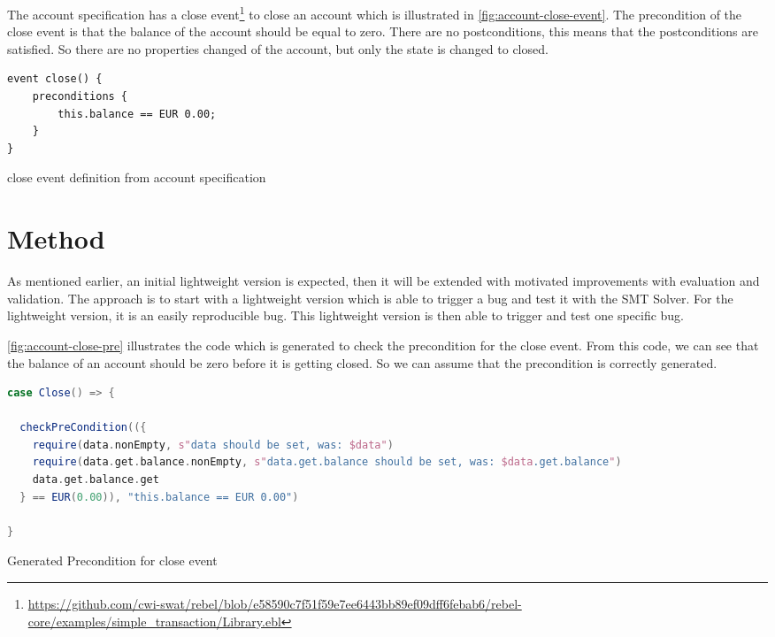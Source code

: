 The account specification has a close event\footnote{\url{https://github.com/cwi-swat/rebel/blob/e58590c7f51f59e7ee6443bb89ef09dff6febab6/rebel-core/examples/simple_transaction/Library.ebl}}
to close an account which is illustrated in \autoref{fig:account-close-event}.
The precondition of the close event is that the balance of the account should be
equal to zero. There are no postconditions, this means that the postconditions
are satisfied. So there are no properties changed of the account, but only the state
is changed to closed.

\begin{sourcecode}[h!]
\begin{lstlisting}[]
event close() {
	preconditions {
		this.balance == EUR 0.00;
	}
}
\end{lstlisting}
\caption{close event definition from account specification}\label{fig:account-close-event}
\end{sourcecode}
\FloatBarrier

\section{Method}

As mentioned earlier, an initial lightweight version is expected, then it will
be extended with motivated improvements with evaluation and validation. The
approach is to start with a lightweight version which is able to trigger a bug
and test it with the SMT Solver. For the lightweight version, it is an easily
reproducible bug. This lightweight version is then able to trigger and test one
specific bug.

\autoref{fig:account-close-pre} illustrates the code which is generated to check
the precondition for the close event. From this code, we can see that the
balance of an account should be zero before it is getting closed. So we can
assume that the precondition is correctly generated.

\begin{sourcecode}[h!]
\begin{lstlisting}[language=scala]
case Close() => {

  checkPreCondition(({
    require(data.nonEmpty, s"data should be set, was: $data")
    require(data.get.balance.nonEmpty, s"data.get.balance should be set, was: $data.get.balance")
    data.get.balance.get
  } == EUR(0.00)), "this.balance == EUR 0.00")

}
\end{lstlisting}
\caption{Generated Precondition for close event}\label{fig:account-close-pre}
\end{sourcecode}
\FloatBarrier

